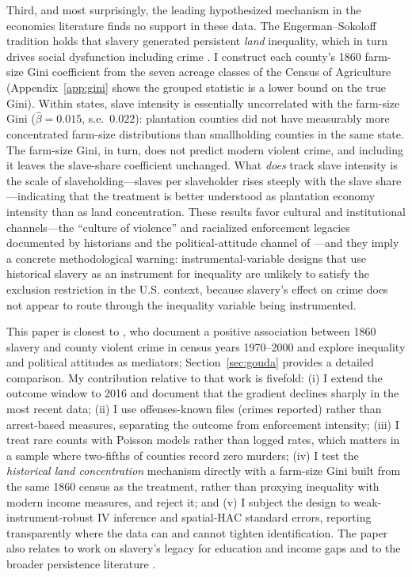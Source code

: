 \documentclass[12pt]{article}
\begin{document}
Third, and most surprisingly, the leading hypothesized mechanism in the economics literature finds no support in these data. The Engerman--Sokoloff tradition holds that slavery generated persistent \emph{land} inequality, which in turn drives social dysfunction including crime \citep{engerman2002, nunn2008americas}. I construct each county's 1860 farm-size Gini coefficient from the seven acreage classes of the Census of Agriculture (Appendix~\ref{app:gini} shows the grouped statistic is a lower bound on the true Gini). Within states, slave intensity is essentially uncorrelated with the farm-size Gini ($\hat{\beta} = 0.015$, s.e.\ $0.022$): plantation counties did not have measurably more concentrated farm-size distributions than smallholding counties in the same state. The farm-size Gini, in turn, does not predict modern violent crime, and including it leaves the slave-share coefficient unchanged. What \emph{does} track slave intensity is the scale of slaveholding---slaves per slaveholder rises steeply with the slave share---indicating that the treatment is better understood as plantation economy intensity than as land concentration. These results favor cultural and institutional channels---the ``culture of violence'' and racialized enforcement legacies documented by historians \citep{tolnay1995, foner1988} and the political-attitude channel of \citet{abs2016}---and they imply a concrete methodological warning: instrumental-variable designs that use historical slavery as an instrument for inequality \citep[as in][]{buonanno2019} are unlikely to satisfy the exclusion restriction in the U.S. context, because slavery's effect on crime does not appear to route through the inequality variable being instrumented.

This paper is closest to \citet{gouda2025}, who document a positive association between 1860 slavery and county violent crime in census years 1970--2000 and explore inequality and political attitudes as mediators; Section~\ref{sec:gouda} provides a detailed comparison. My contribution relative to that work is fivefold: (i) I extend the outcome window to 2016 and document that the gradient declines sharply in the most recent data; (ii) I use offenses-known files (crimes reported) rather than arrest-based measures, separating the outcome from enforcement intensity; (iii) I treat rare counts with Poisson models rather than logged rates, which matters in a sample where two-fifths of counties record zero murders; (iv) I test the \emph{historical land concentration} mechanism directly with a farm-size Gini built from the same 1860 census as the treatment, rather than proxying inequality with modern income measures, and reject it; and (v) I subject the design to weak-instrument-robust IV inference and spatial-HAC standard errors, reporting transparently where the data can and cannot tighten identification. The paper also relates to work on slavery's legacy for education and income gaps \citep{sacerdote2005, bertocchi2014, oconnell2012} and to the broader persistence literature \citep{dell2010, nunn2008qje}.
\end{document}
